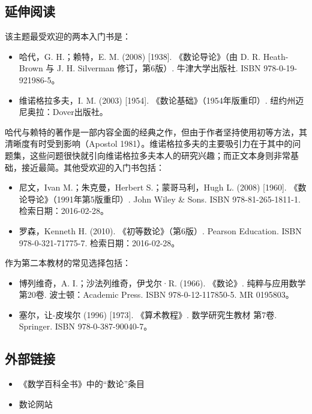 \subsection{延伸阅读}
该主题最受欢迎的两本入门书是：
\begin{itemize}
\item 哈代，G. H.；赖特，E. M. (2008) [1938]. 《数论导论》（由 D. R. Heath-Brown 与 J. H. Silverman 修订，第6版）. 牛津大学出版社. ISBN 978-0-19-921986-5。
\item 维诺格拉多夫，I. M. (2003) [1954]. 《数论基础》（1954年版重印）. 纽约州迈尼奥拉：Dover出版社。
\end{itemize}
哈代与赖特的著作是一部内容全面的经典之作，但由于作者坚持使用初等方法，其清晰度有时受到影响（Apostol 1981）。维诺格拉多夫的主要吸引力在于其中的问题集，这些问题很快就引向维诺格拉多夫本人的研究兴趣；而正文本身则非常基础，接近最简。其他受欢迎的入门书包括：
\begin{itemize}
\item 尼文，Ivan M.；朱克曼，Herbert S.；蒙哥马利，Hugh L. (2008) [1960]. 《数论导论》（1991年第5版重印）. John Wiley & Sons. ISBN 978-81-265-1811-1. 检索日期：2016-02-28。
\item 罗森，Kenneth H. (2010). 《初等数论》（第6版）. Pearson Education. ISBN 978-0-321-71775-7. 检索日期：2016-02-28。
\end{itemize}
作为第二本教材的常见选择包括：
\begin{itemize}
\item 博列维奇，A. I.；沙法列维奇，伊戈尔·R. (1966). 《数论》. 纯粹与应用数学第20卷. 波士顿：Academic Press. ISBN 978-0-12-117850-5. MR 0195803。
\item 塞尔，让-皮埃尔 (1996) [1973]. 《算术教程》. 数学研究生教材 第7卷. Springer. ISBN 978-0-387-90040-7。
\end{itemize}
\subsection{外部链接}
\begin{itemize}
\item 《数学百科全书》中的“数论”条目
\item 数论网站
\end{itemize}